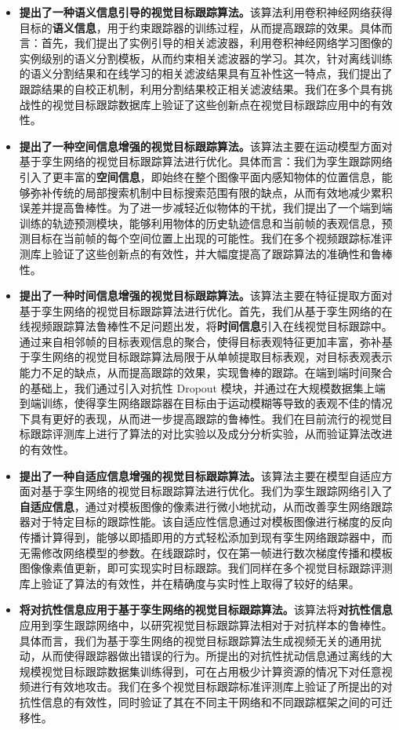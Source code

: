 \begin{itemize}
\item{\textbf{提出了一种语义信息引导的视觉目标跟踪算法。}该算法利用卷积神经网络获得目标的\textbf{语义信息}，用于约束跟踪器的训练过程，从而提高跟踪的效果。具体而言：首先，我们提出了实例引导的相关滤波器，利用卷积神经网络学习图像的实例级别的语义分割模板，从而约束相关滤波器的学习。其次，针对离线训练的语义分割结果和在线学习的相关滤波结果具有互补性这一特点，我们提出了跟踪结果的自校正机制，利用分割结果校正相关滤波结果。我们在多个具有挑战性的视觉目标跟踪数据库上验证了这些创新点在视觉目标跟踪应用中的有效性。}
\item{\textbf{提出了一种空间信息增强的视觉目标跟踪算法。}该算法主要在运动模型方面对基于孪生网络的视觉目标跟踪算法进行优化。具体而言：我们为孪生跟踪网络引入了更丰富的\textbf{空间信息}，即始终在整个图像平面内感知物体的位置信息，能够弥补传统的局部搜索机制中目标搜索范围有限的缺点，从而有效地减少累积误差并提高鲁棒性。为了进一步减轻近似物体的干扰，我们提出了一个端到端训练的轨迹预测模块，能够利用物体的历史轨迹信息和当前帧的表观信息，预测目标在当前帧的每个空间位置上出现的可能性。我们在多个视频跟踪标准评测库上验证了这些创新点的有效性，并大幅度提高了跟踪算法的准确性和鲁棒性。}
\item{\textbf{提出了一种时间信息增强的视觉目标跟踪算法。}该算法主要在特征提取方面对基于孪生网络的视觉目标跟踪算法进行优化。首先，我们从基于孪生网络的在线视频跟踪算法鲁棒性不足问题出发，将\textbf{时间信息}引入在线视觉目标跟踪中。通过来自相邻帧的目标表观信息的聚合，使得目标表观特征更加丰富，弥补基于孪生网络的视觉目标跟踪算法局限于从单帧提取目标表观，对目标表观表示能力不足的缺点，从而提高跟踪的效果，实现鲁棒的跟踪。在端到端时间聚合的基础上，我们通过引入对抗性 Dropout 模块，并通过在大规模数据集上端到端训练，使得孪生网络跟踪器在目标由于运动模糊等导致的表观不佳的情况下具有更好的表现，从而进一步提高跟踪的鲁棒性。我们在目前流行的视觉目标跟踪评测库上进行了算法的对比实验以及成分分析实验，从而验证算法改进的有效性。}
\item{\textbf{提出了一种自适应信息增强的视觉目标跟踪算法。}该算法主要在模型自适应方面对基于孪生网络的视觉目标跟踪算法进行优化。我们为孪生跟踪网络引入了\textbf{自适应信息}，通过对模板图像的像素进行微小地扰动，从而改善孪生网络跟踪器对于特定目标的跟踪性能。该自适应性信息通过对模板图像进行梯度的反向传播计算得到，能够以即插即用的方式轻松添加到现有孪生网络跟踪器中，而无需修改网络模型的参数。在线跟踪时，仅在第一帧进行数次梯度传播和模板图像像素值更新，即可实现实时目标跟踪。我们同样在多个视觉目标跟踪评测库上验证了算法的有效性，并在精确度与实时性上取得了较好的结果。}
\item{\textbf{将对抗性信息应用于基于孪生网络的视觉目标跟踪算法。}该算法将\textbf{对抗性信息}应用到孪生跟踪网络中，以研究视觉目标跟踪算法相对于对抗样本的鲁棒性。具体而言，我们为基于孪生网络的视觉目标跟踪算法生成视频无关的通用扰动，从而使得跟踪器做出错误的行为。所提出的对抗性扰动信息通过离线的大规模视觉目标跟踪数据集训练得到，可在占用极少计算资源的情况下对任意视频进行有效地攻击。我们在多个视觉目标跟踪标准评测库上验证了所提出的对抗性信息的有效性，同时验证了其在不同主干网络和不同跟踪框架之间的可迁移性。}
\end{itemize}

